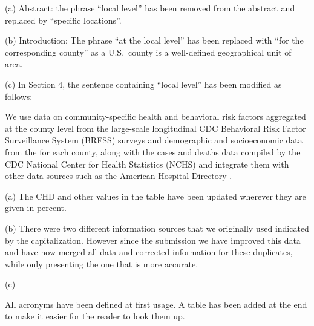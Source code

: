   {

  (a) Abstract: the phrase ``local level'' has been removed from the abstract and replaced by ``specific locations''.

  (b) Introduction: The phrase ``at the local level'' has been replaced with ``for the corresponding county'' as a U.S.~county is a well-defined geographical unit of area.

  (c) In Section 4, the sentence containing   ``local level'' has been modified as follows:
  
We use data on community-specific health and behavioral risk factors
aggregated at the county level from the large-scale longitudinal CDC
Behavioral Risk Factor Surveillance System (BRFSS) surveys
\citep{www-cdc-brfss} and demographic and socioeconomic data from the
\citet{www-sensus} for each county, along with the cases and deaths data compiled by
the CDC National Center for Health Statistics (NCHS)
\citep{www-cdc-nchs} and integrate them with other data sources such as the American Hospital Directory \citep{www-ahd}.



}

%
{ (a) The CHD and other values in the table have been updated wherever
  they are given in percent.

  (b) There were two different information sources that we originally
  used indicated by the capitalization. However since the submission
  we have improved this data and have now merged all data and
  corrected information for these duplicates, while only presenting
  the one that is more accurate.

  (c) 

}



{All acronyms have been defined at first usage. A table has been added
  at the end to make it easier for the reader to look them up.}


